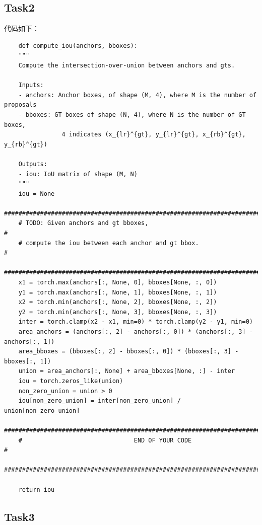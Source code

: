 \documentclass{article}%
\begin{document}
\subsection{Task2}

代码如下：
\begin{lstlisting}
    def compute_iou(anchors, bboxes):
    """
    Compute the intersection-over-union between anchors and gts.
    
    Inputs:
    - anchors: Anchor boxes, of shape (M, 4), where M is the number of proposals
    - bboxes: GT boxes of shape (N, 4), where N is the number of GT boxes,
                4 indicates (x_{lr}^{gt}, y_{lr}^{gt}, x_{rb}^{gt}, y_{rb}^{gt})
    
    Outputs:
    - iou: IoU matrix of shape (M, N)
    """
    iou = None
    ##############################################################################
    # TODO: Given anchors and gt bboxes,                                         #
    # compute the iou between each anchor and gt bbox.                           #
    ##############################################################################
    x1 = torch.max(anchors[:, None, 0], bboxes[None, :, 0])
    y1 = torch.max(anchors[:, None, 1], bboxes[None, :, 1])
    x2 = torch.min(anchors[:, None, 2], bboxes[None, :, 2])
    y2 = torch.min(anchors[:, None, 3], bboxes[None, :, 3])
    inter = torch.clamp(x2 - x1, min=0) * torch.clamp(y2 - y1, min=0)
    area_anchors = (anchors[:, 2] - anchors[:, 0]) * (anchors[:, 3] - anchors[:, 1])
    area_bboxes = (bboxes[:, 2] - bboxes[:, 0]) * (bboxes[:, 3] - bboxes[:, 1])
    union = area_anchors[:, None] + area_bboxes[None, :] - inter
    iou = torch.zeros_like(union)
    non_zero_union = union > 0
    iou[non_zero_union] = inter[non_zero_union] / union[non_zero_union]
    ##############################################################################
    #                               END OF YOUR CODE                             #
    ##############################################################################

    return iou
\end{lstlisting}

\subsection{Task3}

\end{document}
